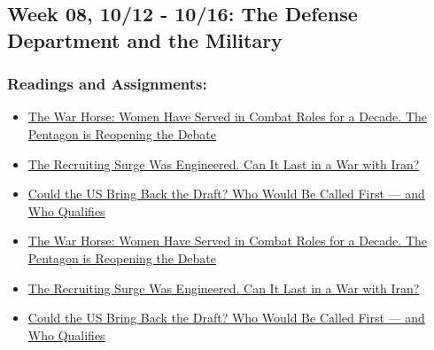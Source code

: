 \documentclass[
  letterpaper,
  DIV=11,
  numbers=noendperiod]{scrartcl}
\providecommand{\tightlist}{%
  \setlength{\itemsep}{0pt}\setlength{\parskip}{0pt}}
\begin{document}
\subsection{Week 08, 10/12 - 10/16: The Defense Department and the
Military}\label{week-08-1012---1016-the-defense-department-and-the-military}

\subsubsection{Readings and
Assignments:}\label{readings-and-assignments-7}

\begin{itemize}
\tightlist
\item
  \href{https://thewarhorse.org/military-standards-women-in-combat/}{The
  War Horse: Women Have Served in Combat Roles for a Decade. The
  Pentagon is Reopening the Debate}
\item
  \href{https://www.military.com/feature/2026/03/24/recruiting-surge-was-engineered-can-it-last-war-iran.html-0}{The
  Recruiting Surge Was Engineered. Can It Last in a War with Iran?}
\item
  \href{https://www.military.com/daily-news/2026/03/11/could-us-bring-back-draft-who-would-be-called-first-and-who-qualifies.html}{Could
  the US Bring Back the Draft? Who Would Be Called First --- and Who
  Qualifies}
\end{itemize}

\begin{tcolorbox}[enhanced jigsaw, arc=.35mm, bottomrule=.15mm, bottomtitle=1mm, breakable, colback=white, colbacktitle=quarto-callout-important-color!10!white, colframe=quarto-callout-important-color-frame, coltitle=black, left=2mm, leftrule=.75mm, opacityback=0, opacitybacktitle=0.6, rightrule=.15mm, title=\textcolor{quarto-callout-important-color}{\faExclamation}\hspace{0.5em}{Friday 10/16: Discussion Day}, titlerule=0mm, toprule=.15mm, toptitle=1mm]

\begin{itemize}
\tightlist
\item
  \href{https://thewarhorse.org/military-standards-women-in-combat/}{The
  War Horse: Women Have Served in Combat Roles for a Decade. The
  Pentagon is Reopening the Debate}
\item
  \href{https://www.military.com/feature/2026/03/24/recruiting-surge-was-engineered-can-it-last-war-iran.html-0}{The
  Recruiting Surge Was Engineered. Can It Last in a War with Iran?}
\item
  \href{https://www.military.com/daily-news/2026/03/11/could-us-bring-back-draft-who-would-be-called-first-and-who-qualifies.html}{Could
  the US Bring Back the Draft? Who Would Be Called First --- and Who
  Qualifies}
\end{itemize}

\end{tcolorbox}
\end{document}
